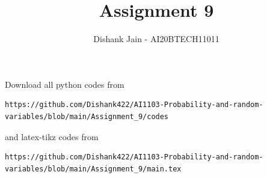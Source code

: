 \documentclass[journal,12pt,twocolumn]{IEEEtran}
\DeclareMathOperator*{\Res}{Res}
\begin{document}
\newcommand{\BEQA}{\begin{eqnarray}}
\newcommand{\EEQA}{\end{eqnarray}}
\newcommand{\define}{\stackrel{\triangle}{=}}

\raggedbottom
\setlength{\parindent}{0pt}
\providecommand{\mbf}{\mathbf}
\providecommand{\pr}[1]{\ensuremath{\Pr\left(#1\right)}}
\providecommand{\qfunc}[1]{\ensuremath{Q\left(#1\right)}}
\providecommand{\sbrak}[1]{\ensuremath{{}\left[#1\right]}}
\providecommand{\lsbrak}[1]{\ensuremath{{}\left[#1\right.}}
\providecommand{\rsbrak}[1]{\ensuremath{{}\left.#1\right]}}
\providecommand{\brak}[1]{\ensuremath{\left(#1\right)}}
\providecommand{\lbrak}[1]{\ensuremath{\left(#1\right.}}
\providecommand{\rbrak}[1]{\ensuremath{\left.#1\right)}}
\providecommand{\cbrak}[1]{\ensuremath{\left\{#1\right\}}}
\providecommand{\lcbrak}[1]{\ensuremath{\left\{#1\right.}}
\providecommand{\rcbrak}[1]{\ensuremath{\left.#1\right\}}}
\theoremstyle{remark}
\newtheorem{rem}{Remark}
\newcommand{\sgn}{\mathop{\mathrm{sgn}}}
\providecommand{\abs}[1]{\vert#1\vert}
\providecommand{\res}[1]{\Res\displaylimits_{#1}} 
\providecommand{\norm}[1]{\lVert#1\rVert}
\providecommand{\mtx}[1]{\mathbf{#1}}
\providecommand{\mean}[1]{E[ #1 ]}
\providecommand{\fourier}{\overset{\mathcal{F}}{ \rightleftharpoons}}
\providecommand{\system}{\overset{\mathcal{H}}{ \longleftrightarrow}}
\newcommand{\solution}{\noindent \textbf{Solution: }}
\newcommand{\cosec}{\,\text{cosec}\,}
\providecommand{\dec}[2]{\ensuremath{\overset{#1}{\underset{#2}{\gtrless}}}}
\newcommand{\myvec}[1]{\ensuremath{\begin{pmatrix}#1\end{pmatrix}}}
\newcommand{\mydet}[1]{\ensuremath{\begin{vmatrix}#1\end{vmatrix}}}
\makeatletter
{}
\makeatother
\let\StandardTheFigure\thefigure
\let\vec\mathbf
\renewcommand{\thefigure}{\theproblem}
\def\putbox#1#2#3{\makebox[0in][l]{\makebox[#1][l]{}\raisebox{\baselineskip}[0in][0in]{\raisebox{#2}[0in][0in]{#3}}}}
     \def\rightbox#1{\makebox[0in][r]{#1}}
     \def\centbox#1{\makebox[0in]{#1}}
     \def\topbox#1{\raisebox{-\baselineskip}[0in][0in]{#1}}
     \def\midbox#1{\raisebox{-0.5\baselineskip}[0in][0in]{#1}}
\vspace{3cm}
\title{Assignment 9}
\author{Dishank Jain - AI20BTECH11011}
\maketitle
\newpage
\bigskip
\renewcommand{\thefigure}{\theenumi}
\renewcommand{\thetable}{\theenumi}
Download all python codes from
%
\begin{lstlisting}
https://github.com/Dishank422/AI1103-Probability-and-random-variables/blob/main/Assignment_9/codes
\end{lstlisting}
%
and latex-tikz codes from
%
\begin{lstlisting}
https://github.com/Dishank422/AI1103-Probability-and-random-variables/blob/main/Assignment_9/main.tex
\end{lstlisting}
\end{document}
